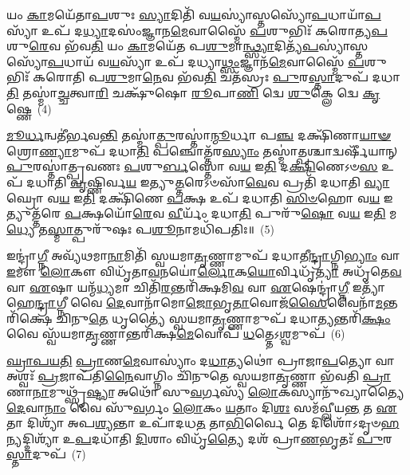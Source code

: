 𑌯𑌂 \ul{𑌕𑌾}\-𑌮𑌯𑍇᳴𑌤𑌾\-\ul{𑌪}\-𑌶𑍁𑌃 \ul{𑌸𑍍𑌯𑌾}\-𑌦𑌿𑌤𑌿᳴ 𑌵\-\ul{𑌯}\-𑌸𑍍𑌯𑌾॑𑌸𑍍𑌤𑌸𑍍𑌯𑍋᳴\-\ul{𑌪}\-𑌧𑌾𑌯𑌾᳴\-\ul{𑌪}\-𑌸𑍍𑌯𑌾᳴ 𑌉𑌪᳴ 𑌦\-\ul{𑌧𑍍𑌯𑌾}\-𑌦𑌸𑌂॑𑌜𑍍𑌞𑌾𑌨\-\ul{𑌮𑍇}\-𑌵𑌾𑌸𑍍𑌮𑍈᳴ \ul{𑌪}\-𑌶𑍁𑌭𑌿𑌃᳴ 𑌕𑌰𑍋𑌤𑍍𑌯\-\ul{𑌪}\-𑌶𑍁\-\ul{𑌰𑍇}\-𑌵 𑌭᳴𑌵\-\ul{𑌤𑌿} 𑌯𑌂 \ul{𑌕𑌾}\-𑌮𑌯𑍇᳴𑌤 𑌪\-\ul{𑌶𑍁}\-𑌮𑌾\-\ul{𑌨𑍍𑌥𑍍𑌸𑍍𑌯𑌾}\-𑌦𑌿𑌤𑍍𑌯᳴\-\ul{𑌪}\-𑌸𑍍𑌯𑌾॑𑌸𑍍𑌤𑌸𑍍𑌯𑍋᳴\-\ul{𑌪}\-𑌧𑌾𑌯᳴ 𑌵\-\ul{𑌯}\-𑌸𑍍𑌯𑌾᳴ 𑌉𑌪᳴ 𑌦𑌧𑍍𑌯𑌾\-\ul{𑌥𑍍𑌸𑌂}\-𑌜𑍍𑌞𑌾𑌨᳴\-\ul{𑌮𑍇}\-𑌵𑌾𑌸𑍍𑌮𑍈᳴ \ul{𑌪}\-𑌶𑍁𑌭𑌿𑌃᳴ 𑌕𑌰𑍋𑌤𑌿 𑌪\-\ul{𑌶𑍁}\-𑌮𑌾\-\ul{𑌨𑍇}\-𑌵 𑌭᳴𑌵\-\ul{𑌤𑌿} 𑌚𑌤᳴𑌸𑍍𑌰𑌃 \ul{𑌪𑍁}\-𑌰\-\ul{𑌸𑍍𑌤𑌾}\-𑌦𑍁𑌪᳴ 𑌦𑌧𑌾\-\ul{𑌤𑌿} 𑌤𑌸𑍍𑌮𑌾॑\-\ul{𑌚𑍍𑌚}\-𑌤𑍍𑌵𑌾\-\ul{𑌰𑌿} 𑌚𑌕𑍍𑌷𑍁᳴𑌷𑍋 \ul{𑌰𑍂}\-𑌪𑌾\-\ul{𑌣𑌿} 𑌦𑍍𑌵𑍇 \ul{𑌶𑍁}\-𑌕𑍍𑌲𑍇 𑌦𑍍𑌵𑍇 \ul{𑌕𑍃}\-𑌷𑍍𑌣𑍇~(4)

\-\ul{𑌮𑍂}\-\-\ul{𑌰𑍍𑌧}\-𑌨𑍍𑌵𑌤𑍀॑𑌰𑍍𑌭𑌵\-\ul{𑌨𑍍𑌤𑌿} 𑌤𑌸𑍍𑌮𑌾॑\-\ul{𑌤𑍍𑌪𑍁}\-𑌰𑌸𑍍𑌤𑌾॑\-\ul{𑌨𑍍𑌮𑍂}\-𑌰𑍍𑌧𑌾 𑌪\-\ul{𑌞𑍍𑌚} 𑌦𑌕𑍍𑌷𑌿᳴𑌣𑌾\-\ul{𑌯𑌾}\-\-\ul{𑍟} 𑌶𑍍𑌰𑍋\-\ul{𑌣𑍍𑌯𑌾}\-𑌮𑍁𑌪᳴ 𑌦𑌧𑌾\-\ul{𑌤𑌿} 𑌪𑌞𑍍𑌚𑍋𑌤𑍍𑌤᳴𑌰\-\ul{𑌸𑍍𑌯𑌾𑌂} 𑌤𑌸𑍍𑌮𑌾॑\-\ul{𑌤𑍍𑌪}\-𑌶𑍍𑌚𑌾𑌦𑍍𑌵𑌰𑍍\mbox{}𑌷𑍀᳴𑌯𑌾𑌨𑍍 \ul{𑌪𑍁}\-𑌰𑌸𑍍𑌤𑌾॑𑌤𑍍𑌪𑍍𑌰𑌵𑌣𑌃 \ul{𑌪}\-𑌶𑍁\-\ul{𑌰𑍍𑌬}\-𑌸𑍍𑌤𑍋 𑌵\-\ul{𑌯} 𑌇\-\ul{𑌤𑌿} 𑌦\-\ul{𑌕𑍍𑌷𑌿}\-𑌣𑍇\-𑌽𑍞\-\ul{𑌸} 𑌉𑌪᳴ 𑌦𑌧𑌾𑌤𑌿 \ul{𑌵𑍃}\-𑌷𑍍𑌣𑌿𑌰𑍍𑌵\-\ul{𑌯} 𑌇𑌤𑍍𑌯𑍁\-\ul{𑌤𑍍𑌤}\-𑌰𑍇\-𑌽𑍞𑌸𑌾᳴\-\ul{𑌵𑍇}\-𑌵 𑌪𑍍𑌰𑌤𑌿᳴ 𑌦𑌧𑌾𑌤𑌿 \ul{𑌵𑍍𑌯𑌾}\-𑌘𑍍𑌰𑍋 𑌵\-\ul{𑌯} 𑌇\-\ul{𑌤𑌿} 𑌦𑌕𑍍𑌷𑌿᳴𑌣𑍇 \ul{𑌪}\-𑌕𑍍𑌷 𑌉𑌪᳴ 𑌦𑌧𑌾𑌤𑌿 \ul{𑌸𑌿}\-\-\ul{𑍞}\-𑌹𑍋 𑌵\-\ul{𑌯} 𑌇𑌤𑍍𑌯𑍁𑌤𑍍𑌤᳴𑌰𑍇 \ul{𑌪}\-𑌕𑍍𑌷𑌯𑍋᳴\-\ul{𑌰𑍇}\-𑌵 \ul{𑌵𑍀}\-𑌰𑍍𑌯𑌂᳴ 𑌦𑌧𑌾\-\ul{𑌤𑌿} 𑌪𑍁𑌰𑍁᳴\-\ul{𑌷𑍋} 𑌵\-\ul{𑌯} 𑌇\-\ul{𑌤𑌿} 𑌮\-\ul{𑌧𑍍𑌯𑍇} 𑌤\-\ul{𑌸𑍍𑌮𑌾}\-𑌤𑍍𑌪𑍁𑌰𑍁᳴𑌷𑌃 𑌪\-\ul{𑌶𑍂}\-𑌨𑌾𑌮𑌧𑌿᳴𑌪𑌤𑌿𑌃॥~(5)

{\anuvakamend[{𑌕𑍢𑌪𑍍𑌤𑍍𑌯𑌾᳴ 𑌉\-\ul{𑌪}\-𑌧𑌾𑌯᳴ 𑌪𑍍𑌰𑌾\-\ul{𑌣}\-𑌭𑍃\-\ul{𑌤𑌃} 𑌸𑌮᳴𑌨𑌸𑌃 \ul{𑌕𑍃}\-𑌷𑍍𑌣𑍇 𑌪𑍁𑌰𑍁᳴\-\ul{𑌷𑍋} 𑌵\-\ul{𑌯} 𑌇\-\ul{𑌤𑌿} 𑌪𑌞𑍍𑌚᳴ 𑌚}]}%

𑌇𑌨𑍍𑌦𑍍𑌰𑌾॑\-\ul{𑌗𑍍𑌨𑍀} 𑌅𑌵𑍍𑌯᳴𑌥𑌮𑌾\-\ul{𑌨𑌾}\-𑌮𑌿𑌤𑌿᳴ 𑌸𑍍𑌵𑌯𑌮𑌾\-\ul{𑌤𑍃}\-𑌣𑍍𑌣𑌾𑌮𑍁𑌪᳴ 𑌦𑌧𑌾𑌤𑍀\-\ul{𑌨𑍍𑌦𑍍𑌰𑌾}\-𑌗𑍍𑌨𑌿\-\ul{𑌭𑍍𑌯𑌾𑌂} 𑌵𑌾 \ul{𑌇}\-𑌮𑍗 \ul{𑌲𑍋}\-𑌕𑍗 𑌵𑌿𑌧𑍃᳴𑌤𑌾\-\ul{𑌵}\-𑌨𑌯𑍋॑\-\ul{𑌰𑍍𑌲𑍋}\-𑌕\-\ul{𑌯𑍋}\-𑌰𑍍𑌵𑌿𑌧𑍃᳴\-\ul{𑌤𑍍𑌯𑌾} 𑌅𑌧𑍃᳴𑌤𑍇\-\ul{𑌵} 𑌵𑌾 \ul{𑌏}\-𑌷𑌾 𑌯𑌨𑍍𑌮᳴\-\ul{𑌧𑍍𑌯}\-𑌮𑌾 𑌚𑌿𑌤𑌿᳴\-\ul{𑌰}\-𑌨𑍍𑌤𑌰𑌿᳴𑌕𑍍𑌷𑌮𑌿\-\ul{𑌵} 𑌵𑌾 \ul{𑌏}\-𑌷𑍇𑌨𑍍𑌦𑍍𑌰𑌾॑\-\ul{𑌗𑍍𑌨𑍀} 𑌇𑌤𑍍𑌯𑌾᳴𑌹𑍇\-\ul{𑌨𑍍𑌦𑍍𑌰𑌾}\-𑌗𑍍𑌨𑍀 𑌵𑍈 \ul{𑌦𑍇}\-𑌵𑌾𑌨𑌾᳴𑌮𑍋\-\ul{𑌜𑍋}\-𑌭𑍃\-\ul{𑌤𑌾}\-𑌵𑍋𑌜᳴\-\ul{𑌸𑍈}\-𑌵𑍈𑌨𑌾᳴\-\-\ul{𑌮}\-𑌨𑍍𑌤𑌰𑌿᳴𑌕𑍍𑌷𑍇 𑌚𑌿𑌨𑍁\-\ul{𑌤𑍇} 𑌧𑍃𑌤𑍍𑌯𑍈॑ 𑌸𑍍𑌵𑌯𑌮𑌾\-\ul{𑌤𑍃}\-𑌣𑍍𑌣𑌾𑌮𑍁𑌪᳴ 𑌦𑌧𑌾\-\ul{𑌤𑍍𑌯}\-𑌨𑍍𑌤𑌰𑌿᳴\-\ul{𑌕𑍍𑌷𑌂} 𑌵𑍈 𑌸𑍍𑌵᳴𑌯𑌮𑌾\-\ul{𑌤𑍃}\-𑌣𑍍𑌣𑌾𑌨𑍍𑌤𑌰𑌿᳴𑌕𑍍𑌷\-\ul{𑌮𑍇}\-𑌵𑍋𑌪᳴ \ul{𑌧}\-𑌤𑍍𑌤𑍇\-𑌽\-\ul{𑌶𑍍𑌵}\-𑌮𑍁𑌪᳴~(6)

\-\ul{𑌘𑍍𑌰𑌾}\-\-\ul{𑌪}\-\-\ul{𑌯}\-\-\ul{𑌤𑌿} \ul{𑌪𑍍𑌰𑌾}\-𑌣\-\ul{𑌮𑍇}\-𑌵𑌾𑌸𑍍𑌯𑌾𑌂॑ 𑌦\-\ul{𑌧𑌾}\-𑌤𑍍𑌯𑌥𑍋॑ 𑌪𑍍𑌰𑌾𑌜𑌾\-\ul{𑌪}\-𑌤𑍍𑌯𑍋 𑌵𑌾 𑌅𑌶𑍍𑌵𑌃᳴ \ul{𑌪𑍍𑌰}\-𑌜𑌾𑌪᳴𑌤𑌿\-\ul{𑌨𑍈}\-𑌵𑌾𑌗𑍍𑌨𑌿𑌂 𑌚𑌿᳴𑌨𑍁𑌤𑍇 𑌸𑍍𑌵𑌯𑌮𑌾\-\ul{𑌤𑍃}\-𑌣𑍍𑌣𑌾 𑌭᳴𑌵𑌤𑌿 \ul{𑌪𑍍𑌰𑌾}\-𑌣𑌾\-\ul{𑌨𑌾}\-𑌮𑍁𑌥𑍍𑌸𑍃᳴\-\ul{𑌷𑍍𑌟𑍍𑌯𑌾} 𑌅𑌥𑍋᳴ 𑌸𑍁\-\ul{𑌵}\-𑌰𑍍𑌗𑌸𑍍𑌯᳴ \ul{𑌲𑍋}\-𑌕𑌸𑍍𑌯𑌾𑌨𑍁᳴𑌖𑍍𑌯𑌾𑌤𑍍𑌯𑍈 \ul{𑌦𑍇}\-𑌵𑌾\-\ul{𑌨𑌾𑌂} 𑌵𑍈 𑌸𑍁᳴\-\ul{𑌵}\-𑌰𑍍𑌗𑌂 \ul{𑌲𑍋}\-𑌕𑌂 \ul{𑌯}\-𑌤𑌾𑌂 𑌦𑌿\-\ul{𑌶𑌃} 𑌸𑌮᳴𑌵𑍍𑌲𑍀𑌯\-\ul{𑌨𑍍𑌤} 𑌤 \ul{𑌏}\-𑌤𑌾 𑌦𑌿𑌶𑍍𑌯𑌾᳴ 𑌅𑌪\-\ul{𑌶𑍍𑌯}\-𑌨𑍍𑌤𑌾 𑌉𑌪𑌾᳴𑌦𑌧\-\ul{𑌤} 𑌤𑌾\-\ul{𑌭𑌿}\-𑌰𑍍𑌵𑍈 𑌤𑍇 𑌦𑌿𑌶𑍋᳴\-𑌽𑌦𑍃𑍞\-\ul{𑌹}\-\-\ul{𑌨𑍍}\-𑌯𑌦𑍍𑌦𑌿𑌶𑍍𑌯𑌾᳴ 𑌉\-\ul{𑌪}\-𑌦𑌧𑌾᳴𑌤𑌿 \ul{𑌦𑌿}\-𑌶𑌾𑌂 𑌵𑌿𑌧𑍃᳴\-\ul{𑌤𑍍𑌯𑍈} 𑌦𑌶᳴ 𑌪𑍍𑌰𑌾\-\ul{𑌣}\-𑌭𑍃𑌤𑌃᳴ \ul{𑌪𑍁}\-𑌰\-\ul{𑌸𑍍𑌤𑌾}\-𑌦𑍁𑌪᳴~(7)

